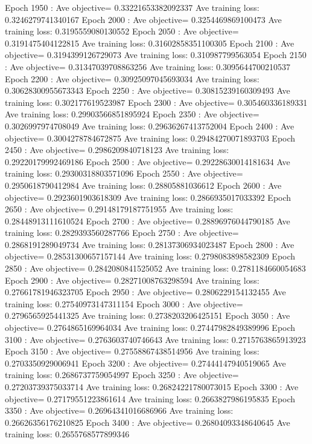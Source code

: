 \documentclass{article}
\theoremstyle{plain}
\theoremstyle{definition}
\begin{document}
\begin{enumerate}
Epoch  1950 : Ave objective= 0.33221653382092337  Ave training loss:  0.3246279741340167
Epoch  2000 : Ave objective= 0.3254469869100473  Ave training loss:  0.3195559080130552
Epoch  2050 : Ave objective= 0.3191475404122815  Ave training loss:  0.31602858351100305
Epoch  2100 : Ave objective= 0.3194399126729073  Ave training loss:  0.310987799563054
Epoch  2150 : Ave objective= 0.31347039708863256  Ave training loss:  0.3095644700210537
Epoch  2200 : Ave objective= 0.30925097045693034  Ave training loss:  0.30628300955673343
Epoch  2250 : Ave objective= 0.30815239160309493  Ave training loss:  0.302177619523987
Epoch  2300 : Ave objective= 0.305460336189331  Ave training loss:  0.29903566851895924
Epoch  2350 : Ave objective= 0.3026997974708049  Ave training loss:  0.29636267413752004
Epoch  2400 : Ave objective= 0.3004278784672875  Ave training loss:  0.29484270071893703
Epoch  2450 : Ave objective= 0.2986209840718123  Ave training loss:  0.29220179992469186
Epoch  2500 : Ave objective= 0.29228630014181634  Ave training loss:  0.29300318803571096
Epoch  2550 : Ave objective= 0.2950618790412984  Ave training loss:  0.28805881036612
Epoch  2600 : Ave objective= 0.2923601903618309  Ave training loss:  0.2866935017033392
Epoch  2650 : Ave objective= 0.29148179187751955  Ave training loss:  0.28448913111610524
Epoch  2700 : Ave objective= 0.28896976044790185  Ave training loss:  0.2829393560287766
Epoch  2750 : Ave objective= 0.2868191289049734  Ave training loss:  0.28137306934023487
Epoch  2800 : Ave objective= 0.28531300657157144  Ave training loss:  0.2798083898582309
Epoch  2850 : Ave objective= 0.2842080841525052  Ave training loss:  0.2781184660054683
Epoch  2900 : Ave objective= 0.28271008763298594  Ave training loss:  0.27661781946323705
Epoch  2950 : Ave objective= 0.2806229154132455  Ave training loss:  0.27540973147311154
Epoch  3000 : Ave objective= 0.2796565925441325  Ave training loss:  0.2738203206425151
Epoch  3050 : Ave objective= 0.2764865169964034  Ave training loss:  0.27447982849389996
Epoch  3100 : Ave objective= 0.2763603740746643  Ave training loss:  0.2715763865913923
Epoch  3150 : Ave objective= 0.27558867438514956  Ave training loss:  0.2703350929006941
Epoch  3200 : Ave objective= 0.27444147940519065  Ave training loss:  0.2686737759054997
Epoch  3250 : Ave objective= 0.27203739375033714  Ave training loss:  0.26824221780073015
Epoch  3300 : Ave objective= 0.27179551223861614  Ave training loss:  0.2663827986195835
Epoch  3350 : Ave objective= 0.26964341016686966  Ave training loss:  0.26626356176210825
Epoch  3400 : Ave objective= 0.26804093348640645  Ave training loss:  0.2655768577899346

\end{enumerate}
\end{document}
